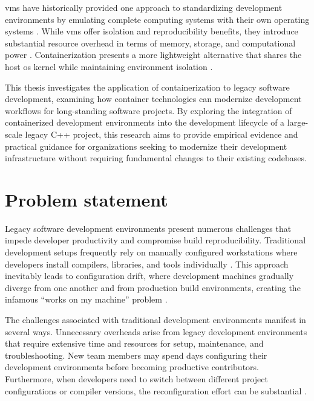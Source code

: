 \acp{vm} have historically provided one approach to standardizing development environments by emulating complete computing systems with their own operating systems \citep{randalIdealRealRevisiting2021}.
While \acp{vm} offer isolation and reproducibility benefits, they introduce substantial resource overhead in terms of memory, storage, and computational power \citep{felterUpdatedPerformanceComparison2015}.
Containerization presents a more lightweight alternative that shares the host \ac{os} kernel while maintaining environment isolation \citep{potdarPerformanceEvaluationDocker2020}.

This thesis investigates the application of containerization to legacy software development, examining how container technologies can modernize development workflows for long-standing software projects.
By exploring the integration of containerized development environments into the development lifecycle of a large-scale legacy C++ project, this research aims to provide empirical evidence and practical guidance for organizations seeking to modernize their development infrastructure without requiring fundamental changes to their existing codebases.

\section{Problem statement}
\label{sec:problem_statement}

Legacy software development environments present numerous challenges that impede developer productivity and compromise build reproducibility.
Traditional development setups frequently rely on manually configured workstations where developers install compilers, libraries, and tools individually \citep{pengReproducibleResearchComputational2011}.
This approach inevitably leads to configuration drift, where development machines gradually diverge from one another and from production build environments, creating the infamous ``works on my machine'' problem \citep{hungGUIdockUsingDocker2016}.

The challenges associated with traditional development environments manifest in several ways.
Unnecessary overheads arise from legacy development environments that require extensive time and resources for setup, maintenance, and troubleshooting.
New team members may spend days configuring their development environments before becoming productive contributors.
Furthermore, when developers need to switch between different project configurations or compiler versions, the reconfiguration effort can be substantial \citep{gygiCppBuildLargeScaleAutomatic2021}.

